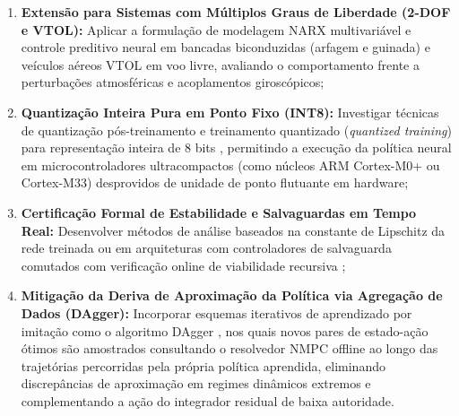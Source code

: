 \begin{enumerate}
    \item \textbf{Extensão para Sistemas com Múltiplos Graus de Liberdade (2-DOF e VTOL):} Aplicar a formulação de modelagem NARX multivariável e controle preditivo neural em bancadas biconduzidas (arfagem e guinada) e veículos aéreos VTOL em voo livre, avaliando o comportamento frente a perturbações atmosféricas e acoplamentos giroscópicos;
    
    \item \textbf{Quantização Inteira Pura em Ponto Fixo (INT8):} Investigar técnicas de quantização pós-treinamento e treinamento quantizado (\textit{quantized training}) para representação inteira de 8 bits \cite{jacob2018quantization}, permitindo a execução da política neural em microcontroladores ultracompactos (como núcleos ARM Cortex-M0+ ou Cortex-M33) desprovidos de unidade de ponto flutuante em hardware;
    
    \item \textbf{Certificação Formal de Estabilidade e Salvaguardas em Tempo Real:} Desenvolver métodos de análise baseados na constante de Lipschitz da rede treinada ou em arquiteturas com controladores de salvaguarda comutados com verificação online de viabilidade recursiva \cite{hose2025approximate};
    
    \item \textbf{Mitigação da Deriva de Aproximação da Política via Agregação de Dados (DAgger):} Incorporar esquemas iterativos de aprendizado por imitação como o algoritmo DAgger \cite{ross2011reduction}, nos quais novos pares de estado-ação ótimos são amostrados consultando o resolvedor NMPC offline ao longo das trajetórias percorridas pela própria política aprendida, eliminando discrepâncias de aproximação em regimes dinâmicos extremos e complementando a ação do integrador residual de baixa autoridade.
\end{enumerate}